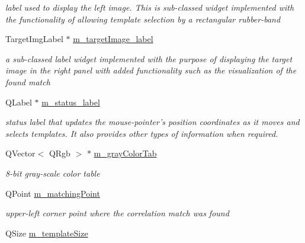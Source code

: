 \begin{CompactItemize}
\begin{CompactList}\small\item\em label used to display the left image. This is sub-classed widget implemented with the functionality of allowing template selection by a rectangular rubber-band \item\end{CompactList}\item 
\hypertarget{classQcorr_8d1e1ab866a811003c435c45de1e958e}{
TargetImgLabel $\ast$ \hyperlink{classQcorr_8d1e1ab866a811003c435c45de1e958e}{m\_\-targetImage\_\-label}}
\label{classQcorr_8d1e1ab866a811003c435c45de1e958e}

\begin{CompactList}\small\item\em a sub-classed label widget implemented with the purpose of displaying the target image in the right panel with added functionality such as the visualization of the found match \item\end{CompactList}\item 
\hypertarget{classQcorr_1bf4a70aa6c4e171f2e0613109bb57e9}{
QLabel $\ast$ \hyperlink{classQcorr_1bf4a70aa6c4e171f2e0613109bb57e9}{m\_\-status\_\-label}}
\label{classQcorr_1bf4a70aa6c4e171f2e0613109bb57e9}

\begin{CompactList}\small\item\em status label that updates the mouse-pointer's position coordinates as it moves and selects templates. It also provides other types of information when required. \item\end{CompactList}\item 
\hypertarget{classQcorr_fa1be55387e39ce5b81e72ecab75b5bc}{
QVector$<$ QRgb $>$ $\ast$ \hyperlink{classQcorr_fa1be55387e39ce5b81e72ecab75b5bc}{m\_\-grayColorTab}}
\label{classQcorr_fa1be55387e39ce5b81e72ecab75b5bc}

\begin{CompactList}\small\item\em 8-bit gray-scale color table \item\end{CompactList}\item 
\hypertarget{classQcorr_8a7f00160ae46441cef038149cf28bdc}{
QPoint \hyperlink{classQcorr_8a7f00160ae46441cef038149cf28bdc}{m\_\-matchingPoint}}
\label{classQcorr_8a7f00160ae46441cef038149cf28bdc}

\begin{CompactList}\small\item\em upper-left corner point where the correlation match was found \item\end{CompactList}\item 
\hypertarget{classQcorr_bc48bdd2110cfdaf7b98dde1cdf42f18}{
QSize \hyperlink{classQcorr_bc48bdd2110cfdaf7b98dde1cdf42f18}{m\_\-templateSize}}
\label{classQcorr_bc48bdd2110cfdaf7b98dde1cdf42f18}


\end{CompactItemize}
